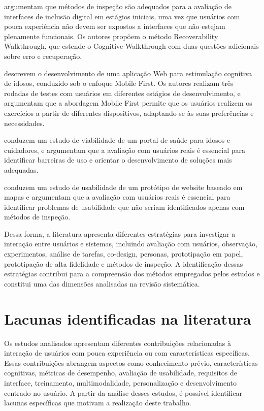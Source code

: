 \cite{filgueiras2009recoverability} argumentam que métodos de inspeção são adequados para a avaliação de interfaces de inclusão digital em estágios iniciais, uma vez que usuários com pouca experiência não devem ser expostos a interfaces que não estejam plenamente funcionais. Os autores propõem o método Recoverability Walkthrough, que estende o Cognitive Walkthrough com duas questões adicionais sobre erro e recuperação.

\cite{martinez2020effectiveness} descrevem o desenvolvimento de uma aplicação Web para estimulação cognitiva de idosos, conduzido sob o enfoque Mobile First. Os autores realizam três rodadas de testes com usuários em diferentes estágios de desenvolvimento, e argumentam que a abordagem Mobile First permite que os usuários realizem os exercícios a partir de diferentes dispositivos, adaptando-se às suas preferências e necessidades.

\cite{barron2013feasibility} conduzem um estudo de viabilidade de um portal de saúde para idosos e cuidadores, e argumentam que a avaliação com usuários reais é essencial para identificar barreiras de uso e orientar o desenvolvimento de soluções mais adequadas.

\cite{xie2010usability} conduzem um estudo de usabilidade de um protótipo de website baseado em mapas e argumentam que a avaliação com usuários reais é essencial para identificar problemas de usabilidade que não seriam identificados apenas com métodos de inspeção.

Dessa forma, a literatura apresenta diferentes estratégias para investigar a interação entre usuários e sistemas, incluindo avaliação com usuários, observação, experimentos, análise de tarefas, co-design, personas, prototipação em papel, prototipação de alta fidelidade e métodos de inspeção. A identificação dessas estratégias contribui para a compreensão dos métodos empregados pelos estudos e constitui uma das dimensões analisadas na revisão sistemática.

\section{Lacunas identificadas na literatura}

\label{sec:lacunas}

Os estudos analisados apresentam diferentes contribuições relacionadas à interação de usuários com pouca experiência ou com características específicas. Essas contribuições abrangem aspectos como conhecimento prévio, características cognitivas, métricas de desempenho, avaliação de usabilidade, requisitos de interface, treinamento, multimodalidade, personalização e desenvolvimento centrado no usuário. A partir da análise desses estudos, é possível identificar lacunas específicas que motivam a realização deste trabalho.


